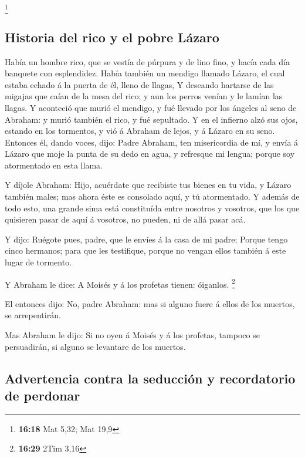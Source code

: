 \footnote{\textbf{16:18} Mat 5,32; Mat 19,9}

\hypertarget{historia-del-rico-y-el-pobre-luxe1zaro}{%
\subsection{Historia del rico y el pobre
Lázaro}\label{historia-del-rico-y-el-pobre-luxe1zaro}}

 Había un hombre rico, que se vestía de púrpura y de lino
fino, y hacía cada día banquete con esplendidez.  Había
también un mendigo llamado Lázaro, el cual estaba echado á la puerta de
él, lleno de llagas,  Y deseando hartarse de las migajas
que caían de la mesa del rico; y aun los perros venían y le lamían las
llagas.  Y aconteció que murió el mendigo, y fué llevado
por los ángeles al seno de Abraham: y murió también el rico, y fué
sepultado.  Y en el infierno alzó sus ojos, estando en los
tormentos, y vió á Abraham de lejos, y á Lázaro en su seno.
 Entonces él, dando voces, dijo: Padre Abraham, ten
misericordia de mí, y envía á Lázaro que moje la punta de su dedo en
agua, y refresque mi lengua; porque soy atormentado en esta llama.

 Y díjole Abraham: Hijo, acuérdate que recibiste tus bienes
en tu vida, y Lázaro también males; mas ahora éste es consolado aquí, y
tú atormentado.  Y además de todo esto, una grande sima
está constituída entre nosotros y vosotros, que los que quisieren pasar
de aquí á vosotros, no pueden, ni de allá pasar acá.

 Y dijo: Ruégote pues, padre, que le envíes á la casa de mi
padre;  Porque tengo cinco hermanos; para que les
testifique, porque no vengan ellos también á este lugar de tormento.

 Y Abraham le dice: A Moisés y á los profetas tienen:
óiganlos. \footnote{\textbf{16:29} 2Tim 3,16}

 El entonces dijo: No, padre Abraham: mas si alguno fuere á
ellos de los muertos, se arrepentirán.

 Mas Abraham le dijo: Si no oyen á Moisés y á los profetas,
tampoco se persuadirán, si alguno se levantare de los muertos.

\hypertarget{advertencia-contra-la-seducciuxf3n-y-recordatorio-de-perdonar}{%
\subsection{Advertencia contra la seducción y recordatorio de
perdonar}\label{advertencia-contra-la-seducciuxf3n-y-recordatorio-de-perdonar}}

